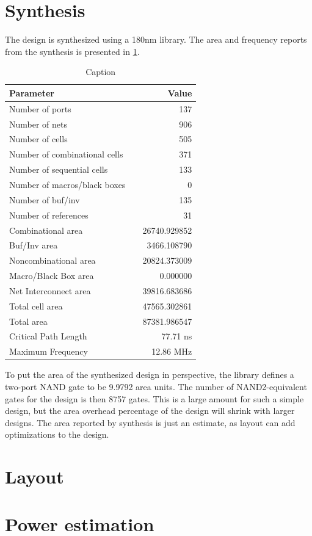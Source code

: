\section{Synthesis}
The design is synthesized using a 180nm library. The area and frequency reports from the synthesis is presented in \cref{tab:synthreportex}.
\begin{table}[]
    \centering
    \begin{tabular}{lcr}
        \textbf{Parameter} && \textbf{Value} \\
        \toprule
        Number of ports && 137 \\
        Number of nets && 906 \\
        Number of cells && 505 \\
        Number of combinational cells && 371 \\
        Number of sequential cells && 133 \\
        Number of macros/black boxes && 0 \\
        Number of buf/inv && 135 \\
        Number of references && 31 \\
        \midrule
        Combinational area && 26740.929852 \\
        Buf/Inv area && 3466.108790 \\
        Noncombinational area && 20824.373009 \\
        Macro/Black Box area && 0.000000 \\
        Net Interconnect area && 39816.683686 \\
        \midrule
        Total cell area && 47565.302861 \\
        Total area && 87381.986547 \\
        \midrule
        Critical Path Length && 77.71 ns \\
        Maximum Frequency && 12.86 MHz\\
        \bottomrule
    \end{tabular}
    \caption{Caption}
    \label{tab:synthreportex}
\end{table}
To put the area of the synthesized design in perspective, the library defines a two-port NAND gate to be 9.9792 area units. The number of NAND2-equivalent gates for the design is then 8757 gates. This is a large amount for such a simple design, but the area overhead percentage of the design will shrink with larger designs. The area reported by synthesis is just an estimate, as layout can add optimizations to the design.
\section{Layout}

\section{Power estimation}

